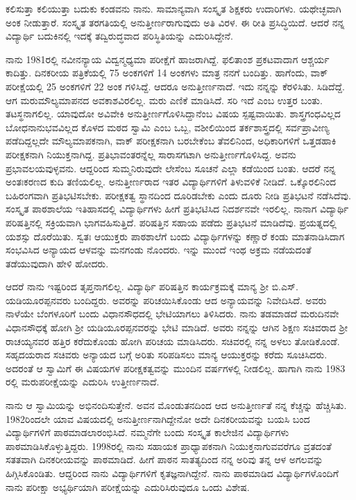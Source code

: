 ಕಲಿಸುತ್ತಾ ಕಲಿಯುತ್ತಾ ಬದುಕು ಕಂಡವನು ನಾನು. ಸಾಮಾನ್ಯವಾಗಿ ಸಂಸ್ಕೃತ ಶಿಕ್ಷಕರು ಉದಾರಿಗಳು.  ಯಥೇಚ್ಛವಾಗಿ ಅಂಕ ನೀಡುತ್ತಾರೆ.  ಸಂಸ್ಕೃತ ತರಗತಿಯಲ್ಲಿ ಅನುತ್ತೀರ್ಣರಾಗುವುದು ಅತಿ ವಿರಳ. ಈ ರೀತಿ ಪ್ರಸಿದ್ಧಿಯಿದೆ. ಆದರೆ ನನ್ನ ವಿದ್ಯಾರ್ಥಿ ಬದುಕಿನಲ್ಲಿ ಇದಕ್ಕೆ ತದ್ವಿರುದ್ಧವಾದ ಪರಿಸ್ಥಿತಿಯನ್ನು ಎದುರಿಸಿದ್ದೇನೆ.  

ನಾನು 1981ರಲ್ಲಿ ನವೀನನ್ಯಾಯ ವಿದ್ವನ್ಮಧ್ಯಮಾ ಪರೀಕ್ಷೆಗೆ ಹಾಜರಾಗಿದ್ದೆ.  ಫಲಿತಾಂಶ ಪ್ರಕಟವಾದಾಗ ಆಶ್ಚರ್ಯ ಕಾದಿತ್ತು.  ದಿನಕರೀಯ ಪತ್ರಿಕೆಯಲ್ಲಿ 75 ಅಂಕಗಳಿಗೆ 14 ಅಂಕಗಳು ಮಾತ್ರ ನನಗೆ ಬಂದಿತ್ತು. ಹಾಗೆಂದು, ವಾಕ್ ಪರೀಕ್ಷೆಯಲ್ಲಿ 25 ಅಂಕಗಳಿಗೆ 22 ಅಂಕ ಗಳಿಸಿದ್ದೆ.  ಆದರೂ ಅನುತ್ತೀರ್ಣನಾದೆ.  ಇದು ನನ್ನನ್ನು ಕೆರಳಿಸಿತು.  ಸಿಡಿದೆದ್ದೆ. ಆಗ ಮರುಮೌಲ್ಯಮಾಪನದ ಅವಕಾಶವಿರಲಿಲ್ಲ.  ಮರು ಎಣಿಕೆ ಮಾಡಿಸಿದೆ.  ಸರಿ ಇದೆ ಎಂಬ ಉತ್ತರ ಬಂತು.  ತಟಸ್ಥನಾಗಲಿಲ್ಲ.  ಯಾವುದೋ ಅವಿವೇಕಿ ಅನುತ್ತೀರ್ಣಗೊಳಿಸಿದ್ದಾನೆಂಬ  ವಿಷಯ ಸ್ಪಷ್ಟವಾಯಿತು.  ಶಾಸ್ತ್ರಗಂಧವಿಲ್ಲದ ಬೋಧನಾನುಭವವಿಲ್ಲದ ಕೊಳದ ಮಠದ ಸ್ವಾಮಿ ಎಂಬ ಒಬ್ಬ, ವಶೀಲಿಯಿಂದ ತರ್ಕಶಾಸ್ತ್ರದಲ್ಲಿ ಸರ್ವಪ್ರಾವೀಣ್ಯ ಪಡೆದಿದ್ದಲ್ಲದೇ ಮೌಲ್ಯಮಾಪಕನಾಗಿ, ವಾಕ್ ಪರೀಕ್ಷಕನಾಗಿ ಬರಬೇಕೆಂಬ ತೆವಲಿನಿಂದ, ಅಧಿಕಾರಿಗಳಿಗೆ ಒತ್ತಡಹಾಕಿ ಪರೀಕ್ಷಕನಾಗಿ ನಿಯುಕ್ತನಾಗಿದ್ದ.  ಪ್ರತಿಭಾವಂತರನ್ನೆಲ್ಲ ಸಾರಾಸಗಟಾಗಿ ಅನುತ್ತೀರ್ಣಗೊಳಿಸಿದ್ದ.  ಅವನು ಪ್ರಭಾವಲಯವುಳ್ಳವನು.  ಆದ್ದರಿಂದ ಸುಮ್ಮನಿರುವುದೇ ಲೇಸೆಂಬ ಸೂಚನೆ ಎಲ್ಲಾ ಕಡೆಯಿಂದ ಬಂತು.  ಆದರೆ ನನ್ನ ಅಂತಃಕರಣದ ಕುದಿ ತಣಿಯಲಿಲ್ಲ.  ಅನುತ್ತೀರ್ಣರಾದ ಇತರ ವಿದ್ಯಾರ್ಥಿಗಳಿಗೆ ತಿಳುವಳಿಕೆ ನೀಡಿದೆ.  ಒಕ್ಕೊರಲಿನಿಂದ ಬಹಿರಂಗವಾಗಿ ಪ್ರತಿಭಟಿಸಬೇಕು. ಪರೀಕ್ಷಕತ್ವ ಸ್ಥಾನದಿಂದ ದೂರಿಡಬೇಕು ಎಂದು ದೂರು ನೀಡಿ ಪ್ರತಿಭಟನೆ ನಡೆಸಿದೆವು.  ಸಂಸ್ಕೃತ ಪಾಠಶಾಲೆಯ ಇತಿಹಾಸದಲ್ಲಿ ವಿದ್ಯಾರ್ಥಿಗಳು ಹೀಗೆ ಪ್ರತಿಭಟಿಸಿದ ನಿದರ್ಶನವೇ ಇರಲಿಲ್ಲ.  ನಾನಾಗ ವಿದ್ಯಾರ್ಥಿ ಪರಿಷತ್ತಿನಲ್ಲಿ ಸಕ್ರಿಯವಾಗಿ ಭಾಗವಹಿಸುತ್ತಿದೆ.  ಪರಿಷತ್ತಿನ ಸಹಾಯ ಪಡೆದು ಪ್ರತಿಭಟನೆ ಮಾಡಿದೆವು.  ಪ್ರಯತ್ನದಲ್ಲಿ ಯಶಸ್ಸು ದೊರೆಯಿತು.  ಸ್ವತಃ ಆಯುಕ್ತರು ಪಾಠಶಾಲೆಗೆ ಬಂದು ವಿದ್ಯಾರ್ಥಿಗಳನ್ನು ಕಣ್ಣಾರೆ ಕಂಡು ಮಾತನಾಡಿಸಿದಾಗ ಸಂಭವಿಸಿದ ಅನ್ಯಾಯದ ಆಳವನ್ನು ಮನಗಂಡು ನೊಂದರು.  ಇನ್ನು ಮುಂದೆ ಇಂಥ ಅಕ್ರಮ ನಡೆಯದಂತೆ ತಡೆಯುವುದಾಗಿ ಹೇಳಿ ಹೋದರು.  

ಆದರೆ ನಾನು ಇಷ್ಟರಿಂದ ತೃಪ್ತನಾಗಲಿಲ್ಲ.  ವಿದ್ಯಾರ್ಥಿ ಪರಿಷತ್ತಿನ ಕಾರ್ಯಕ್ರಮಕ್ಕೆ ಮಾನ್ಯ ಶ್ರೀ ಬಿ.ಎಸ್. ಯಡಿಯೂರಪ್ಪನವರು ಬಂದಿದ್ದರು.  ಅವರನ್ನು ಪರಿಚಯಿಸಿಕೊಂಡು ಆದ ಅನ್ಯಾಯವನ್ನು ನಿವೇದಿಸಿದೆ.  ಅವರು ನಾಳೆಯೇ ಬೆಂಗಳೂರಿಗೆ ಬಂದು ವಿಧಾನಸೌಧದಲ್ಲಿ ಭೇಟಿಯಾಗಲು ತಿಳಿಸಿದರು.  ನಾನು ತಡಮಾಡದೆ ಮರುದಿನವೇ ವಿಧಾನಸೌಧಕ್ಕೆ ಹೋಗಿ ಶ್ರೀ ಯಡಿಯೂರಪ್ಪನವರನ್ನು ಭೇಟಿ ಮಾಡಿದೆ.  ಅವರು ನನ್ನನ್ನು ಆಗಿನ ಶಿಕ್ಷಣ ಸಚಿವರಾದ ಶ್ರೀ ರಾಚಯ್ಯನವರ ಹತ್ತಿರ ಕರೆದುಕೊಂಡು ಹೋಗಿ ಪರಿಚಯ ಮಾಡಿಸಿದರು.  ಸಚಿವರಲ್ಲಿ ನನ್ನ ಅಳಲು ತೋಡಿಕೊಂಡೆ.  ಸಹೃದಯರಾದ ಸಚಿವರು ಅನ್ಯಾಯದ ಬಗ್ಗೆ ಅರಿತು ಸರಿಪಡಿಸಲು ಮಾನ್ಯ ಆಯುಕ್ತರನ್ನು ಕರೆದು ಸೂಚಿಸಿದರು.  ಅದರಂತೆ ಆ ಸ್ವಾಮಿಗೆ ಈ ವಿಷಯಗಳ ಪರೀಕ್ಷಕತ್ವವನ್ನು ಮುಂದಿನ ವರ್ಷಗಳಲ್ಲಿ ನೀಡಲಿಲ್ಲ.  ಹಾಗಾಗಿ ನಾನು 1983 ರಲ್ಲಿ ಮರುಪರೀಕ್ಷೆಯನ್ನು ಎದುರಿಸಿ ಉತ್ತೀರ್ಣನಾದೆ.  

ನಾನು ಆ ಸ್ವಾಮಿಯನ್ನು ಅಭಿನಂದಿಸುತ್ತೇನೆ.  ಅವನ ಮೊಂಡುತನದಿಂದ ಆದ ಅನುತ್ತೀರ್ಣತೆ ನನ್ನ ಕೆಚ್ಚನ್ನು ಹೆಚ್ಚಿಸಿತು.  1982ರಿಂದಲೇ ಯಾವ ವಿಷಯದಲ್ಲಿ ಅನುತ್ತೀರ್ಣನಾಗಿದ್ದೇನೋ ಅದೇ ದಿನಕರೀಯವನ್ನು ಬಯಸಿ ಬಂದ ವಿದ್ಯಾರ್ಥಿಗಳಿಗೆ ಪಾಠಮಾಡಲಾರಂಭಿಸಿದೆ. ನಮ್ಮನೆಗೇ ಬಂದು ಸಂಸ್ಕೃತ ಕಾಲೇಜಿನ ವಿದ್ಯಾರ್ಥಿಗಳು ಪಾಠಮಾಡಿಸಿಕೊಳ್ಳುತ್ತಿದ್ದರು.  1998ರಲ್ಲಿ ನಾನು ಸಹಾಯಕ ಪ್ರಾಧ್ಯಾಪಕನಾಗಿ ನಿಯುಕ್ತನಾಗುವವರೆಗೂ ವ್ರತದಂತೆ ಸತತವಾಗಿ ದಿನಕರೀಯವನ್ನು ಪಾಠಮಾಡಿದೆ.  ಹೀಗೆ ಪಾಠನ ಸಾತತ್ಯದಿಂದ ನನ್ನ ಅರಿವು ತನ್ನ ಆಳ ಅಗಲವನ್ನು ಹಿಗ್ಗಿಸಿಕೊಂಡಿತು. ಆದ್ದರಿಂದ ನಾನು ವಿದ್ಯಾರ್ಥಿಗಳಿಗೆ ಕೃತಜ್ಞನಾಗಿದ್ದೇನೆ.  ನಾನು ಪಾಠಮಾಡಿದ ವಿದ್ಯಾರ್ಥಿಗಳೊಂದಿಗೆ ನಾನು ಪರೀಕ್ಷಾ ಅಭ್ಯರ್ಥಿಯಾಗಿ ಪರೀಕ್ಷೆಯನ್ನು ಎದುರಿಸಿರುವುದೂ ಒಂದು ವಿಶೇಷ.

